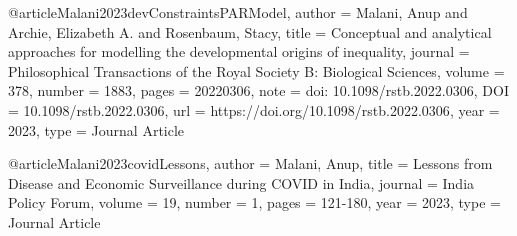 {{%

@article{Malani2023devConstraintsPARModel,
   author = {Malani, Anup and Archie, Elizabeth A. and Rosenbaum, Stacy},
   title = {Conceptual and analytical approaches for modelling the developmental origins of inequality},
   journal = {Philosophical Transactions of the Royal Society B: Biological Sciences},
   volume = {378},
   number = {1883},
   pages = {20220306},
   note = {doi: 10.1098/rstb.2022.0306},
   DOI = {10.1098/rstb.2022.0306},
   url = {https://doi.org/10.1098/rstb.2022.0306},
   year = {2023},
   type = {Journal Article}
}

@article{Malani2023covidLessons,
   author = {Malani, Anup},
   title = {Lessons from Disease and Economic Surveillance during COVID in India},
   journal = {India Policy Forum},
   volume = {19},
   number = {1},
   pages = {121-180},
   year = {2023},
   type = {Journal Article}
}


}}
